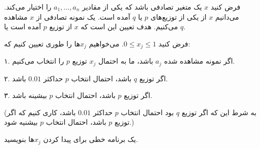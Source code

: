 فرض کنید
$x$
یک متغیر تصادفی باشد که یکی از مقادیر
$a_1, \ldots, a_n$
را اختیار می‌کند. می‌دانیم
$x$
از یکی از توزیع‌های
$p$
یا 
$q$
آمده است. یک نمونه تصادفی از
$x$
مشاهده می‌کنیم. هدف تعیین این است که
$x$
از توزیع‌
$p$
آمده است یا
$q$.

فرض کنید
$0 \leq x_j \leq 1$.
می‌خواهیم
$x_j$ها
را طوری تعیین کنیم که:
\vspace*{5pt}

\hspace*{5pt}
۱.  اگر نمونه مشاهده شده
$a_j$
باشد، ما به احتمال
$x_j$
توزیع‌
$p$
را انتخاب می‌کنیم.
\vspace*{5pt}

\hspace*{5pt}
۲.  اگر توزیع
$q$
باشد، احتمال انتخاب
$p$
حداکثر
$0.01$
باشد.
\vspace*{5pt}

\hspace*{5pt}
۳.  اگر توزیع 
$p$
باشد، احتمال انتخاب
$p$
بیشینه باشد.
\vspace*{5pt}

(به شرط این که اگر توزیع
$q$
بود احتمال انتخاب
$p$
حداکثر
$0.01$
باشد، کاری کنیم که اگر توزیع
$p$
باشد، احتمال انتخاب
$p$
بیشنیه شود.)

یک برنامه خطی برای پیدا کردن
$x_j$ها
بنویسید.